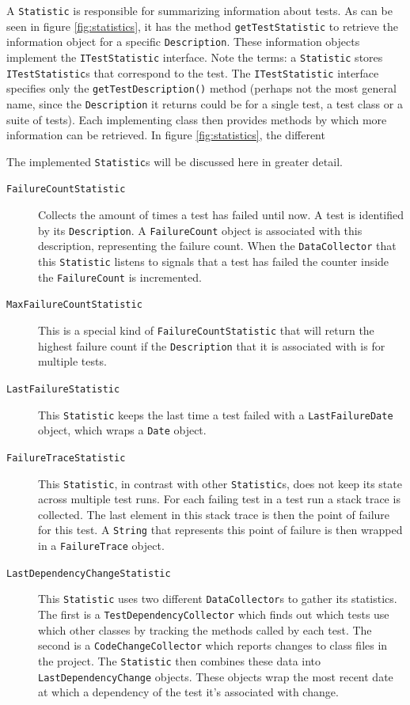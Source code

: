 \documentclass[i2]{oss}
\newcommand{\class}[1]{\texttt{#1}}
\newcommand{\method}[1]{\texttt{#1}}
\begin{document}
A \class{Statistic} is responsible for summarizing information about tests. As can be seen in figure \ref{fig:statistics}, it has the method \method{getTestStatistic} to retrieve the information object for a specific \class{Description}.
These information objects implement the \class{ITestStatistic} interface. Note the terms: a \class{Statistic} stores \class{ITestStatistic}s that correspond to the test.
The \class{ITestStatistic} interface specifies only the \method{getTestDescription()} method 
(perhaps not the most general name, since the \class{Description} it returns
could be for a single test, a test class or a suite of tests).
Each implementing class then provides methods by which more information can be retrieved. In figure \ref{fig:statistics}, the different \


The implemented \class{Statistic}s will be discussed here in greater detail.
\begin{description}

\item [\class{FailureCountStatistic}] Collects the amount of times a test 
has failed until now.
A test is identified by its \class{Description}.
A \class{FailureCount} object is associated with this description,
representing the failure count.
When the \class{DataCollector} that this \class{Statistic} listens to
signals that a test has failed the counter inside the 
\class{FailureCount} is incremented.

\item [\class{MaxFailureCountStatistic}] This is a special kind of 
\class{FailureCountStatistic} that will return the highest failure count if the \class{Description} that it is associated with is for multiple tests.

\item [\class{LastFailureStatistic}] This \class{Statistic} keeps the 
last time a test failed with a \class{LastFailureDate} object, which
wraps a \class{Date} object.

\item [\class{FailureTraceStatistic}] This \class{Statistic}, in contrast
with other \class{Statistic}s, does not keep its state across multiple
test runs.
For each failing test in a test run a stack trace is collected. 
The last element in this stack trace is then the point of failure for 
this test.
A \class{String} that represents this point of failure is then wrapped
in a \class{FailureTrace} object.

\item [\class{LastDependencyChangeStatistic}] This \class{Statistic} uses
two different \class{DataCollector}s to gather its statistics.
The first is a \class{TestDependencyCollector} which finds out which 
tests use which other classes by tracking the methods called by each
test.
The second is a \class{CodeChangeCollector} which reports changes to
class files in the project.
The \class{Statistic} then combines these data into 
\class{LastDependencyChange} objects.
These objects wrap the most recent date at which a dependency of the 
test it's associated with change.

\end{description}
\end{document}

